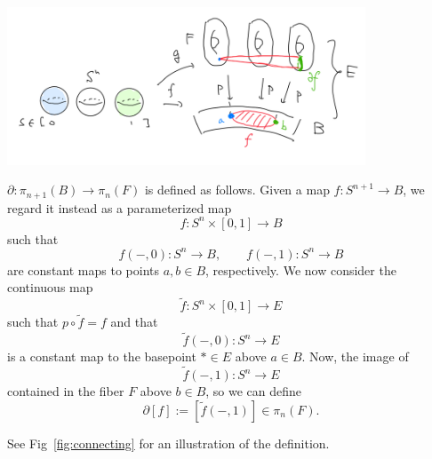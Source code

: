 \documentclass[12pt]{article}
\numberwithin{equation}{section}
\numberwithin{figure}{section}
\theoremstyle{remark}
\renewenvironment{figure}[1][]{
  \begin{originalfigure}[#1]
    \begin{mdframed}[linecolor=black!0,backgroundcolor=black!1]
}{
    \end{mdframed}
  \end{originalfigure}
}
\begin{document}
\begin{figure}[h]
  \centering
  \includegraphics[width=0.8\textwidth]{connecting.png}
  \caption{The connecting map $\partial$}
  \label{fig:connecting}
\end{figure}
\begin{definition}
  \label{def:connecting-map-homotopy}
  $\partial:\pi_{n+1}(B)\to \pi_{n}(F)$ is defined as follows.
  Given a map $f:S^{n+1}\to B$, we regard it instead as a parameterized map
  \begin{equation}
  f: S^n\times [0,1] \to B
  \end{equation} such that \begin{equation}
    f(-,0):S^n\to B,\qquad
    f(-,1):S^n\to B
  \end{equation}
  are constant maps to points $a,b\in B$, respectively.
  We now consider the continuous map \begin{equation}
    \tilde f:S^n\times [0,1]\to E
  \end{equation}
  such that $p\circ \tilde f=f$ and that \begin{equation}
    \tilde f(-,0): S^n\to E
  \end{equation} is a constant map to the basepoint $*\in E$ above $a\in B$.
  Now, the image of  \begin{equation}
    \tilde f(-,1): S^n\to E
  \end{equation} contained in the fiber $F$ above $b\in B$,
  so we can define \begin{equation}
    \partial [f] := [\tilde f(-,1)]\in \pi_n(F).
  \end{equation}
\end{definition}
See Fig~\ref{fig:connecting} for an illustration of the definition.
\end{document}
